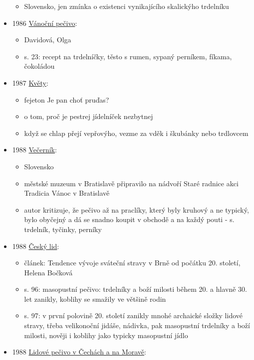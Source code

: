 \begin{itemize}
  \begin{itemize}
  \tightlist
  \item
    Slovensko, jen zmínka o existenci vynikajícího skalickýho trdelníku
  \end{itemize}
\item
  1986
  \href{https://ceskadigitalniknihovna.cz/uuid/uuid:9e7ab0f0-3a6b-11e4-8e0d-005056827e51}{Vánoční
  pečivo}:

  \begin{itemize}
  \tightlist
  \item
    Davidová, Olga
  \item
    s. 23: recept na trdelníčky, těsto s rumen, sypaný perníkem, fíkama,
    čokoládou
  \end{itemize}
\item
  1987
  \href{https://ceskadigitalniknihovna.cz/uuid/uuid:fb80fd90-a376-11e3-aa54-5ef3fc9bb22f}{Květy}:

  \begin{itemize}
  \tightlist
  \item
    fejeton Je pan choť pruďas?
  \item
    o tom, proč je pestrej jídelníček nezbytnej
  \item
    když se chlap přejí vepřovýho, vezme za vděk i škubánky nebo
    trdlovcem
  \end{itemize}
\item
  1988
  \href{https://dikda.snk.sk/uuid/uuid:f1160e6b-b724-4a15-ba1e-ad92b54d2423}{Večerník}:

  \begin{itemize}
  \tightlist
  \item
    Slovensko
  \item
    městské muzeum v Bratislavě připravilo na nádvoří Staré radnice akci
    Tradicia Vánoc v Bratislavě
  \item
    autor kritizuje, že pečivo až na praclíky, který byly kruhový a ne
    typický, bylo obyčejný a dá se snadno koupit v obchodě a na každý
    pouti - s. trdelník, tyčinky, perníky
  \end{itemize}
\item
  1988
  \href{https://ceskadigitalniknihovna.cz/uuid/uuid:d410e1e0-4611-11e1-1331-001143e3f55c}{Český
  lid}:

  \begin{itemize}
  \tightlist
  \item
    článek: Tendence vývoje sváteční stravy v Brně od počátku 20.
    století, Helena Bočková
  \item
    s. 96: masopustní pečivo: trdelníky a boží milosti během 20. a
    hlavně 30. let zanikly, koblihy se smažily ve většině rodin
  \item
    s. 97: v první polovině 20. století zanikly mnohé archaické složky
    lidové stravy, třeba velikonoční jidáše, nádivka, pak masopustní
    trdelníky a boží milosti, nověji i koblihy jako typicky masopustní
    jídlo
  \end{itemize}
\item
  1988
  \href{https://ceskadigitalniknihovna.cz/uuid/uuid:0a416360-305d-11e9-844c-005056827e51}{Lidové
  pečivo v Čechách a na Moravě}:


\end{itemize}
